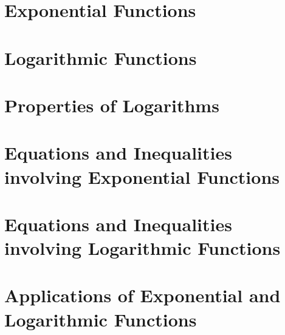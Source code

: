 \documentclass{ximera}
\begin{document}
	\author{Stitz-Zeager}


\section{Exponential Functions}



\newpage

\section{Logarithmic Functions}



\newpage

\section{Properties of Logarithms}



\newpage

\section{Equations and Inequalities involving Exponential Functions}



\newpage

\section{Equations and Inequalities involving Logarithmic Functions}



\newpage

\section{Applications of Exponential and Logarithmic Functions}


\end{document}
